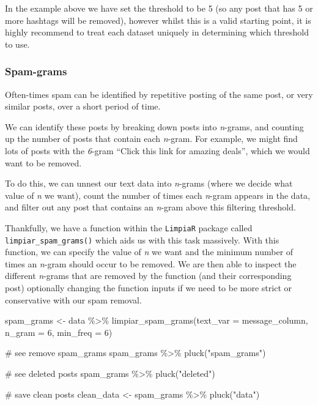 \documentclass[
  letterpaper,
  DIV=11,
  numbers=noendperiod]{scrreprt}
\newenvironment{Shaded}{\begin{snugshade}}{\end{snugshade}}
\newcommand{\AttributeTok}[1]{\textcolor[rgb]{0.40,0.45,0.13}{#1}}
\newcommand{\CommentTok}[1]{\textcolor[rgb]{0.37,0.37,0.37}{#1}}
\newcommand{\DecValTok}[1]{\textcolor[rgb]{0.68,0.00,0.00}{#1}}
\newcommand{\FunctionTok}[1]{\textcolor[rgb]{0.28,0.35,0.67}{#1}}
\newcommand{\NormalTok}[1]{\textcolor[rgb]{0.00,0.23,0.31}{#1}}
\newcommand{\OtherTok}[1]{\textcolor[rgb]{0.00,0.23,0.31}{#1}}
\newcommand{\SpecialCharTok}[1]{\textcolor[rgb]{0.37,0.37,0.37}{#1}}
\newcommand{\StringTok}[1]{\textcolor[rgb]{0.13,0.47,0.30}{#1}}
\begin{document}
In the example above we have set the threshold to be 5 (so any post that
has 5 or more hashtags will be removed), however whilst this is a valid
starting point, it is highly recommend to treat each dataset uniquely in
determining which threshold to use.

\subsubsection{Spam-grams}\label{spam-grams}

Often-times spam can be identified by repetitive posting of the same
post, or very similar posts, over a short period of time.

We can identify these posts by breaking down posts into \emph{n}-grams,
and counting up the number of posts that contain each \emph{n}-gram. For
example, we might find lots of posts with the \emph{6}-gram ``Click this
link for amazing deals'', which we would want to be removed.

To do this, we can unnest our text data into \emph{n}-grams (where we
decide what value of \emph{n} we want), count the number of times each
\emph{n}-gram appears in the data, and filter out any post that contains
an \emph{n}-gram above this filtering threshold.

Thankfully, we have a function within the \texttt{LimpiaR} package
called \texttt{limpiar\_spam\_grams()} which aids us with this task
massively. With this function, we can specify the value of \emph{n} we
want and the minimum number of times an \emph{n}-gram should occur to be
removed. We are then able to inspect the different \emph{n}-grams that
are removed by the function (and their corresponding post) optionally
changing the function inputs if we need to be more strict or
conservative with our spam removal.

\begin{Shaded}
\begin{Highlighting}[]
\NormalTok{spam\_grams }\OtherTok{\textless{}{-}}\NormalTok{ data }\SpecialCharTok{\%\textgreater{}\%} 
  \FunctionTok{limpiar\_spam\_grams}\NormalTok{(}\AttributeTok{text\_var =}\NormalTok{ message\_column,}
                     \AttributeTok{n\_gram =} \DecValTok{6}\NormalTok{,}
                     \AttributeTok{min\_freq =} \DecValTok{6}\NormalTok{)}

\CommentTok{\# see remove spam\_grams}
\NormalTok{spam\_grams }\SpecialCharTok{\%\textgreater{}\%} 
  \FunctionTok{pluck}\NormalTok{(}\StringTok{"spam\_grams"}\NormalTok{)}

\CommentTok{\# see deleted posts}
\NormalTok{spam\_grams }\SpecialCharTok{\%\textgreater{}\%} 
  \FunctionTok{pluck}\NormalTok{(}\StringTok{"deleted"}\NormalTok{)}

\CommentTok{\# save \textquotesingle{}clean\textquotesingle{} posts}
\NormalTok{clean\_data }\OtherTok{\textless{}{-}}\NormalTok{ spam\_grams }\SpecialCharTok{\%\textgreater{}\%} 
  \FunctionTok{pluck}\NormalTok{(}\StringTok{"data"}\NormalTok{)}
\end{Highlighting}
\end{Shaded}
\end{document}
